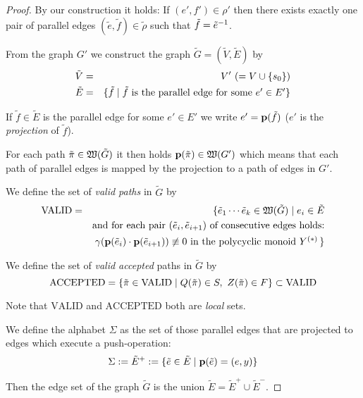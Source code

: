 \begin{proof}
By our construction it holds:
If $(e', f') \in \rho'$ then there exists exactly one pair of parallel edges
$(\tilde e, \tilde f) \in \tilde\rho$ such that $\tilde f = \mbox{${\tilde e}^{-1}$}$.

From the graph $G'$ we construct the graph $\tilde{G} = (\tilde{V}, \tilde{E})$
by
\begin{eqnarray*}
\tilde{V} &=& V' \ (=V \cup \mbox{$\{s_0\}$}) \\
\tilde{E} &=& \mbox{$\{\tilde f \mid \tilde f \text{ is the parallel edge for some
}e' \in E'\}$}
\end{eqnarray*}

If $\tilde f \in \tilde{E}$ is the parallel edge for some $e' \in E'$ we write
$e' = \mathbf{p}({\tilde f})$ ($e'$ is the {\em projection} of $\tilde f$). 

For each path $\tilde{\pi} \in \mbox{$\mathfrak{W}({\tilde{G}})$}$ it then holds
$\mathbf{p}({\tilde{\pi}}) \in \mbox{$\mathfrak{W}({G'})$}$ which means that each path of parallel
edges is mapped by the projection to a path of edges in $G'$.

\newcommand{\validpaths}{\mathrm{VALID}}
We define the set of {\em valid paths} in $\tilde{G}$ by
\begin{eqnarray*}
\validpaths &=& \{ \tilde e_1 \cdots \tilde e_k \in \pathcat{\tilde{G}}
\mid e_i \in \tilde{E} \\
& & \text{and for each pair }(\tilde e_i, \tilde e_{i+1})\text{ of consecutive
edges holds:}\\
& & \gamma(\proj{\tilde{e}_i} \cdot \proj{\tilde{e}_{i+1}}) \not\equiv 0\text{
in the polycyclic monoid }\pocymon{Y} \,\}
\end{eqnarray*} 

\newcommand{\acceptedpaths}{\mathrm{ACCEPTED}}
We define the set of {\em valid accepted} paths in $\tilde{G}$ by
\begin{equation*}
\acceptedpaths = \setof{\tilde\pi \in \validpaths \mid Q(\tilde\pi) \in
S,\ Z(\tilde\pi) \in F} \subset \validpaths
\end{equation*}

Note that $\validpaths$ and $\acceptedpaths$ both are {\em local} sets.

We define the alphabet $\Sigma$ as the set of those parallel edges that are
projected to edges which execute a push-operation:
\begin{equation*}
\Sigma := \tilde{E}^+ := \mbox{$\{\tilde e \in \tilde{E} \mid \mathbf{p}({\tilde e}) =
(e, y)\}$}
\end{equation*}

Then the edge set of the graph $\tilde{G}$ is the union $\tilde{E} =
\tilde{E}^+ \cup \tilde{E}^-$.


\end{proof}

